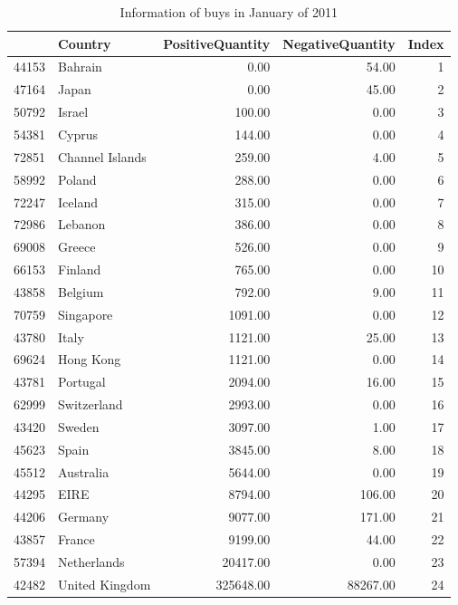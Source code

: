 \documentclass[conference]{IEEEtran}\usepackage[]{graphicx}\usepackage[]{color}
\begin{document}
\begin{itemize}
\begin{table}[ht]
\centering
\begin{tabular}{rlrrr}
  \hline
 & Country & PositiveQuantity & NegativeQuantity & Index \\ 
  \hline
44153 & Bahrain & 0.00 & 54.00 &   1 \\ 
  47164 & Japan & 0.00 & 45.00 &   2 \\ 
  50792 & Israel & 100.00 & 0.00 &   3 \\ 
  54381 & Cyprus & 144.00 & 0.00 &   4 \\ 
  72851 & Channel Islands & 259.00 & 4.00 &   5 \\ 
  58992 & Poland & 288.00 & 0.00 &   6 \\ 
  72247 & Iceland & 315.00 & 0.00 &   7 \\ 
  72986 & Lebanon & 386.00 & 0.00 &   8 \\ 
  69008 & Greece & 526.00 & 0.00 &   9 \\ 
  66153 & Finland & 765.00 & 0.00 &  10 \\ 
  43858 & Belgium & 792.00 & 9.00 &  11 \\ 
  70759 & Singapore & 1091.00 & 0.00 &  12 \\ 
  43780 & Italy & 1121.00 & 25.00 &  13 \\ 
  69624 & Hong Kong & 1121.00 & 0.00 &  14 \\ 
  43781 & Portugal & 2094.00 & 16.00 &  15 \\ 
  62999 & Switzerland & 2993.00 & 0.00 &  16 \\ 
  43420 & Sweden & 3097.00 & 1.00 &  17 \\ 
  45623 & Spain & 3845.00 & 8.00 &  18 \\ 
  45512 & Australia & 5644.00 & 0.00 &  19 \\ 
  44295 & EIRE & 8794.00 & 106.00 &  20 \\ 
  44206 & Germany & 9077.00 & 171.00 &  21 \\ 
  43857 & France & 9199.00 & 44.00 &  22 \\ 
  57394 & Netherlands & 20417.00 & 0.00 &  23 \\ 
  42482 & United Kingdom & 325648.00 & 88267.00 &  24 \\ 
   \hline
\end{tabular}
\caption{Information of buys in January of 2011} 
\end{table}


\end{itemize}
\end{document}
